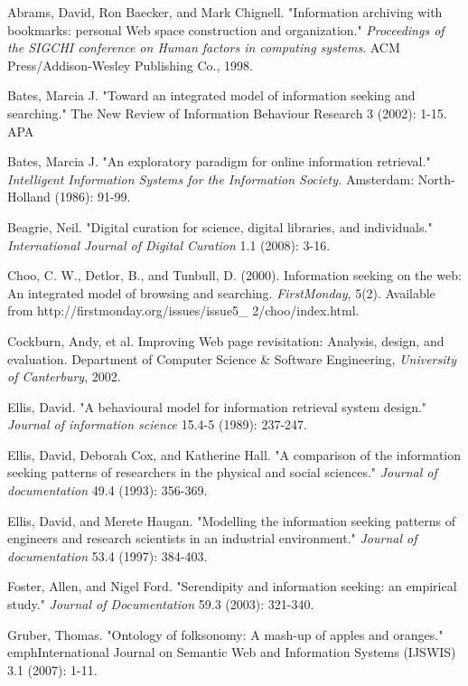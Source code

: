 \documentclass{casconpaper}
\begin{document}
{\begin{thebibliography}{9}
Abrams, David, Ron Baecker, and Mark Chignell. "Information archiving with bookmarks: personal Web space construction and organization." \emph{Proceedings of the SIGCHI conference on Human factors in computing systems}. ACM Press/Addison-Wesley Publishing Co., 1998.

Bates, Marcia J. "Toward an integrated model of information seeking and searching." The New Review of Information Behaviour Research 3 (2002): 1-15.
APA	

Bates, Marcia J. "An exploratory paradigm for online information retrieval." \emph{Intelligent Information Systems for the Information Society.} Amsterdam: North-Holland (1986): 91-99.

Beagrie, Neil. "Digital curation for science, digital libraries, and individuals." \emph{International Journal of Digital Curation} 1.1 (2008): 3-16.

Choo, C. W., Detlor, B., and Tunbull, D. (2000). Information seeking on the web: An integrated model of browsing and searching.  \emph{FirstMonday}, 5(2). Available from http://firstmonday.org/issues/issue5\_
2/choo/index.html.

Cockburn, Andy, et al. Improving Web page revisitation: Analysis, design, and evaluation. Department of Computer Science \& Software Engineering, \emph{University of Canterbury}, 2002.

Ellis, David. "A behavioural model for information retrieval system design." \emph{Journal of information science} 15.4-5 (1989): 237-247.

Ellis, David, Deborah Cox, and Katherine Hall. "A comparison of the information seeking patterns of researchers in the physical and social sciences." \emph{Journal of documentation} 49.4 (1993): 356-369.

Ellis, David, and Merete Haugan. "Modelling the information seeking patterns of engineers and research scientists in an industrial environment." \emph{Journal of documentation} 53.4 (1997): 384-403.

Foster, Allen, and Nigel Ford. "Serendipity and information seeking: an empirical study." \emph{Journal of Documentation} 59.3 (2003): 321-340.

Gruber, Thomas. "Ontology of folksonomy: A mash-up of apples and oranges." emph{International Journal on Semantic Web and Information Systems (IJSWIS)} 3.1 (2007): 1-11.


\end{thebibliography}}
\end{document}
